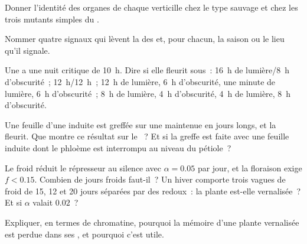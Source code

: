 \begin{exercise}[$\star$]\label{exo:b2:plant-flowering:3}
Donner l'identité des organes de chaque verticille chez le type sauvage
et chez les trois mutants simples du .
\end{exercise}

\begin{exercise}[$\star$]\label{exo:b2:plant-flowering:4}
Nommer quatre signaux qui lèvent la  des  et, pour
chacun, la saison ou le lieu qu'il signale.
\end{exercise}

\begin{exercise}[$\star\star$]\label{exo:b2:plant-flowering:5}
Une  a une nuit critique de \qty{10}{h}. Dire si
elle fleurit sous~: \qty{16}{h} de lumière/\qty{8}{h} d'obscurité~;
\qty{12}{h}/\qty{12}{h}~;
\qty{12}{h} de lumière, \qty{6}{h} d'obscurité, une minute de lumière,
\qty{6}{h} d'obscurité~;
\qty{8}{h} de lumière, \qty{4}{h} d'obscurité, \qty{4}{h} de lumière,
\qty{8}{h} d'obscurité.
\end{exercise}

\begin{exercise}[$\star\star$]\label{exo:b2:plant-flowering:6}
Une feuille d'une  induite est greffée sur une
 maintenue en jours longs, et la  fleurit. Que montre ce résultat sur le ~? Et si la
greffe est faite avec une feuille induite dont le phloème est
interrompu au niveau du pétiole~?
\end{exercise}

\begin{exercise}[$\star\star$]\label{exo:b2:plant-flowering:7}
Le froid réduit le répresseur au silence avec $\alpha = 0.05$ par jour,
et la floraison exige $f < 0.15$. Combien de jours froids faut-il~? Un
hiver comporte trois vagues de froid de 15, 12 et 20 jours séparées par
des redoux~: la plante est-elle vernalisée~? Et si $\alpha$ valait
$0.02$~?
\end{exercise}

\begin{exercise}[$\star\star$]\label{exo:b2:plant-flowering:8}
Expliquer, en termes de chromatine, pourquoi la mémoire d'une plante
vernalisée est perdue dans ses , et pourquoi c'est utile.
\end{exercise}

